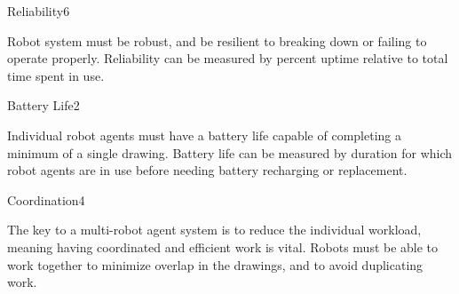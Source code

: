 \begin{nonfunctional_requirement}{Reliability}{6}
\item Robot system must be robust, and be resilient to breaking down or failing to operate properly. Reliability can be measured by percent uptime relative to total time spent in use.
\end{nonfunctional_requirement}

\begin{nonfunctional_requirement}{Battery Life}{2}
\item Individual robot agents must have a battery life capable of completing a minimum of a single drawing. Battery life can be measured by duration for which robot agents are in use before needing battery recharging or replacement.
\end{nonfunctional_requirement}

\begin{nonfunctional_requirement}{Coordination}{4}
\item The key to a multi-robot agent system is to reduce the individual workload, meaning having coordinated and efficient work is vital. Robots must be able to work together to minimize overlap in the drawings, and to avoid duplicating work.
\end{nonfunctional_requirement}


